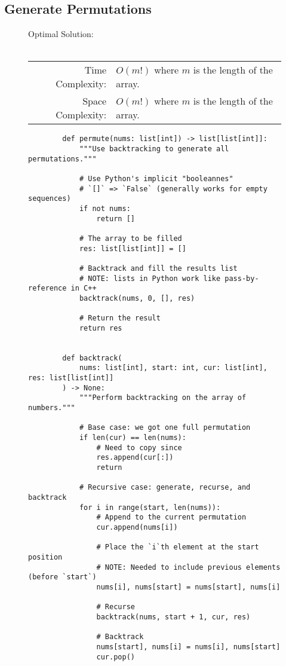 
\subsection{Generate Permutations}

\begin{figure}[H]
    Optimal Solution:\\\\
    \begin{tabular}{rl}
        Time Complexity:& \(O(m!)\) where \(m\) is the length of the array.\\
        Space Complexity:& \(O(m!)\) where \(m\) is the length of the array.
    \end{tabular}
\end{figure}

\begin{figure}[H]
    \centering
    \begin{verbatim}
        def permute(nums: list[int]) -> list[list[int]]:
            """Use backtracking to generate all permutations."""

            # Use Python's implicit "booleannes"
            # `[]` => `False` (generally works for empty sequences)
            if not nums:
                return []

            # The array to be filled
            res: list[list[int]] = []

            # Backtrack and fill the results list
            # NOTE: lists in Python work like pass-by-reference in C++
            backtrack(nums, 0, [], res)

            # Return the result
            return res


        def backtrack(
            nums: list[int], start: int, cur: list[int], res: list[list[int]]
        ) -> None:
            """Perform backtracking on the array of numbers."""

            # Base case: we got one full permutation
            if len(cur) == len(nums):
                # Need to copy since
                res.append(cur[:])
                return

            # Recursive case: generate, recurse, and backtrack
            for i in range(start, len(nums)):
                # Append to the current permutation
                cur.append(nums[i])

                # Place the `i`th element at the start position
                # NOTE: Needed to include previous elements (before `start`)
                nums[i], nums[start] = nums[start], nums[i]

                # Recurse
                backtrack(nums, start + 1, cur, res)

                # Backtrack
                nums[start], nums[i] = nums[i], nums[start]
                cur.pop()
    \end{verbatim}
\end{figure}
